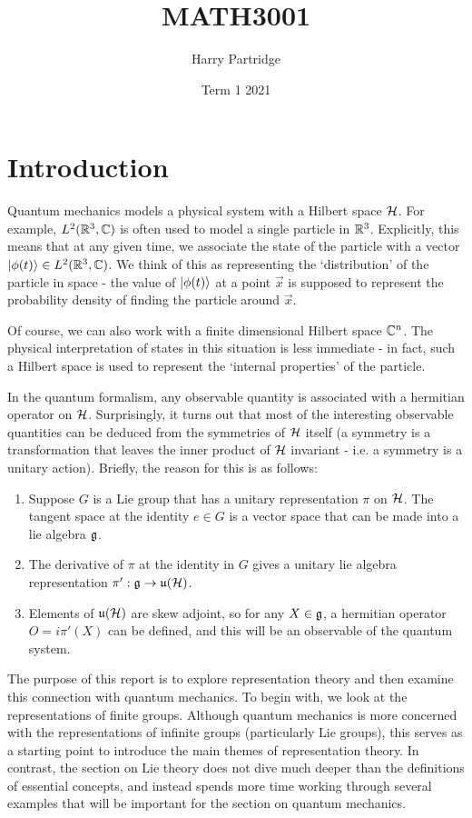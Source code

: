 \documentclass[a4paper]{article}
\title{MATH3001}
\author{Harry Partridge}
\date{Term 1 2021}
\begin{document}
\maketitle

\tableofcontents

\newpage
\section{Introduction}
Quantum mechanics models a physical system with a Hilbert space $\mathcal{H}$. For example, $L^2(\mathbb{R}^3, \mathbb{C})$ is often used to model a single particle in $\mathbb{R}^3$. Explicitly, this means that at any given time, we associate the state of the particle with a vector $\left\lvert \phi(t) \right\rangle \in L^2(\mathbb{R}^3, \mathbb{C})$. We think of this as representing the `distribution' of the particle in space - the value of $\left\lvert \phi(t) \right\rangle$ at a point $\vec{x}$ is supposed to represent the probability density of finding the particle around $\vec{x}$. 

Of course, we can also work with a finite dimensional Hilbert space $\mathbb{C}^n$. The physical interpretation of states in this situation is less immediate - in fact, such a Hilbert space is used to represent the `internal properties' of the particle. 

In the quantum formalism, any observable quantity is associated with a hermitian operator on $\mathcal{H}$. Surprisingly, it turns out that most of the interesting observable quantities can be deduced from the symmetries of $\mathcal{H}$ itself (a symmetry is a transformation that leaves the inner product of $\mathcal{H}$ invariant - i.e. a symmetry is a unitary action). Briefly, the reason for this is as follows:
\begin{enumerate}
    \item Suppose $G$ is a Lie group that has a unitary representation $\pi$ on $\mathcal{H}$. The tangent space at the identity $e \in G$ is a vector space that can be made into a lie algebra $\mathfrak{g}$. 
    \item The derivative of $\pi$ at the identity in $G$ gives a unitary lie algebra representation $\pi' : \mathfrak{g} \to \mathfrak{u}(\mathcal{H})$. 
    \item Elements of $\mathfrak{u}(\mathcal{H})$ are skew adjoint, so for any $X \in \mathfrak{g}$, a hermitian operator $O = i\pi'(X)$ can be defined, and this will be an observable of the quantum system. 
\end{enumerate}

The purpose of this report is to explore representation theory and then examine this connection with quantum mechanics. To begin with, we look at the representations of finite groups. Although quantum mechanics is more concerned with the representations of infinite groups (particularly Lie groups), this serves as a starting point to introduce the main themes of representation theory. In contrast, the section on Lie theory does not dive much deeper than the definitions of essential concepts, and instead spends more time working through several examples that will be important for the section on quantum mechanics. 
\end{document}
